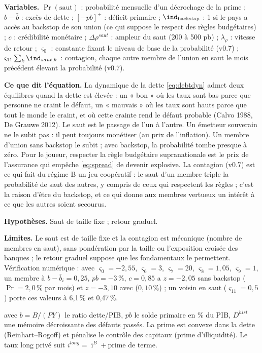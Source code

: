 \documentclass[11pt,a4paper]{article}
\newcommand{\og}{« }
\newcommand{\fg}{ »}
\newcommand{\variables}{\par\noindent\textbf{Variables.} }
\newcommand{\sens}{\par\noindent\textbf{Ce que dit l'équation.} }
\newcommand{\hyp}{\par\noindent\textbf{Hypothèses.} }
\newcommand{\limites}{\par\noindent\textbf{Limites.} }
\newcommand{\pos}[1]{{\left[#1\right]^{+}}}
\begin{document}
\begin{lecture}
\variables $\Pr(\text{saut})$ : probabilité mensuelle d'un décrochage de la prime ; $b-\bar b$ : excès de dette ; $\pos{-pb}$ : déficit primaire ; $\ind_{\text{backstop}}$ : 1 si le pays a accès au backstop de son union (ce qui suppose le respect des règles budgétaires) ; $c$ : crédibilité monétaire ; $\Delta\rho^{saut}$ : ampleur du saut (200 à 500 pb) ; $\lambda_\rho$ : vitesse de retour ; $\varsigma_0$ : constante fixant le niveau de base de la probabilité (v0.7) ; $\varsigma_{11}\sum_k \ind_{saut,k}$ : contagion, chaque autre membre de l'union en saut le mois précédent élevant la probabilité (v0.7).
\sens La dynamique de la dette \eqref{eq:debtdyn} admet deux équilibres quand la dette est élevée : un \og bon\fg{} où les taux sont bas parce que personne ne craint le défaut, un \og mauvais\fg{} où les taux sont hauts parce que tout le monde le craint, et où cette crainte rend le défaut probable (Calvo 1988, De Grauwe 2012). Le saut est le passage de l'un à l'autre. Un émetteur souverain ne le subit pas : il peut toujours monétiser (au prix de l'inflation). Un membre d'union sans backstop le subit ; avec backstop, la probabilité tombe presque à zéro. Pour le joueur, respecter la règle budgétaire supranationale est le prix de l'assurance qui empêche \eqref{eq:spread} de devenir explosive. La contagion (v0.7) est ce qui fait du régime B un jeu coopératif : le saut d'un membre triple la probabilité de saut des autres, y compris de ceux qui respectent les règles ; c'est la raison d'être du backstop, et ce qui donne aux membres vertueux un intérêt à ce que les autres soient secourus.
\hyp Saut de taille fixe ; retour graduel.
\limites Le saut est de taille fixe et la contagion est mécanique (nombre de membres en saut), sans pondération par la taille ou l'exposition croisée des banques ; le retour graduel suppose que les fondamentaux le permettent. Vérification numérique : avec $\varsigma_0=-2{,}55$, $\varsigma_6=3$, $\varsigma_7=20$, $\varsigma_8=1{,}05$, $\varsigma_9=1$, un membre à $b-\bar b_i=0{,}25$, $pb=-3\,\%$, $c=0{,}85$ a $z=-2{,}05$ sans backstop ($\Pr=2{,}0\,\%$ par mois) et $z=-3{,}10$ avec ($0{,}10\,\%$) ; un voisin en saut ($\varsigma_{11}=0{,}5$) porte ces valeurs à 6,1\,\% et 0,47\,\%.
\end{lecture}

avec $b = B/(PY)$ le ratio dette/PIB, $pb$ le solde primaire en \% du PIB, $D^{hist}$ une mémoire décroissante des défauts passés. La prime est convexe dans la dette (Reinhart--Rogoff) et pénalise le contrôle des capitaux (prime d'illiquidité). Le taux long privé suit $i^{long} = \bar\imath^{B} + \text{prime de terme}$.
\end{document}

